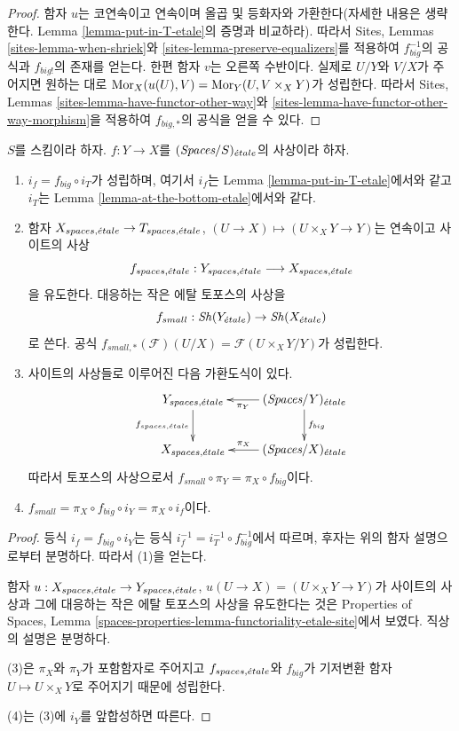 \begin{proof}
함자 $u$는 코연속이고 연속이며 올곱 및 등화자와 가환한다(자세한 내용은
생략한다. Lemma \ref{lemma-put-in-T-etale}의 증명과 비교하라). 따라서
Sites, Lemmas \ref{sites-lemma-when-shriek}와
\ref{sites-lemma-preserve-equalizers}를 적용하여 $f_{big}^{-1}$의 공식과
$f_{big!}$의 존재를 얻는다. 한편 함자 $v$는 오른쪽 수반이다. 실제로
$U/Y$와 $V/X$가 주어지면 원하는 대로
$\mathop{\mathrm{Mor}}\nolimits_X(u(U), V) = \mathop{\mathrm{Mor}}\nolimits_Y(U, V \times_X Y)$가 성립한다. 따라서 Sites,
Lemmas \ref{sites-lemma-have-functor-other-way}와
\ref{sites-lemma-have-functor-other-way-morphism}을 적용하여 $f_{big, *}$의
공식을 얻을 수 있다.
\end{proof}

\begin{lemma}
\label{lemma-morphism-big-small-etale}
$S$를 스킴이라 하자. $f : Y \to X$를
$(\textit{Spaces}/S)_{\acute{e}tale}$의 사상이라 하자.
\begin{enumerate}
\item $i_f = f_{big} \circ i_T$가 성립하며, 여기서 $i_f$는 Lemma
\ref{lemma-put-in-T-etale}에서와 같고 $i_T$는 Lemma
\ref{lemma-at-the-bottom-etale}에서와 같다.
\item 함자 $X_{spaces, {\acute{e}tale}} \to T_{spaces, {\acute{e}tale}}$,
$(U \to X) \mapsto (U \times_X Y \to Y)$는 연속이고 사이트의 사상
$$
f_{spaces, {\acute{e}tale}} : Y_{spaces, {\acute{e}tale}} \longrightarrow X_{spaces, {\acute{e}tale}}
$$
을 유도한다. 대응하는 작은 에탈 토포스의 사상을
$$
f_{small} : \mathop{\mathit{Sh}}\nolimits(Y_{\acute{e}tale}) \to \mathop{\mathit{Sh}}\nolimits(X_{\acute{e}tale})
$$
로 쓴다. 공식
$f_{small, *}(\mathcal{F})(U/X) = \mathcal{F}(U \times_X Y/Y)$가 성립한다.
\item 사이트의 사상들로 이루어진 다음 가환도식이 있다.
$$
\xymatrix{
Y_{spaces, \etale} \ar[d]_{f_{spaces, \etale}} &
(\textit{Spaces}/Y)_\etale \ar[d]^{f_{big}} \ar[l]^-{\pi_Y}\\
X_{spaces, \etale} &
(\textit{Spaces}/X)_\etale \ar[l]_-{\pi_X}
}
$$
따라서 토포스의 사상으로서
$f_{small} \circ \pi_Y = \pi_X \circ f_{big}$이다.
\item $f_{small} = \pi_X \circ f_{big} \circ i_Y = \pi_X \circ i_f$이다.
\end{enumerate}
\end{lemma}

\begin{proof}
등식 $i_f = f_{big} \circ i_Y$는 등식
$i_f^{-1} = i_T^{-1} \circ f_{big}^{-1}$에서 따르며, 후자는 위의 함자
설명으로부터 분명하다.
따라서 (1)을 얻는다.

\medskip\noindent
함자 $u : X_{spaces, {\acute{e}tale}} \to Y_{spaces, {\acute{e}tale}}$,
$u(U \to X) = (U \times_X Y \to Y)$가 사이트의 사상과 그에 대응하는
작은 에탈 토포스의 사상을 유도한다는 것은 Properties of Spaces, Lemma
\ref{spaces-properties-lemma-functoriality-etale-site}에서 보였다.
직상의 설명은 분명하다.

\medskip\noindent
(3)은 $\pi_X$와 $\pi_Y$가 포함함자로 주어지고
$f_{spaces, {\acute{e}tale}}$와 $f_{big}$가 기저변환 함자
$U \mapsto U \times_X Y$로 주어지기 때문에 성립한다.

\medskip\noindent
(4)는 (3)에 $i_Y$를 앞합성하면 따른다.
\end{proof}

